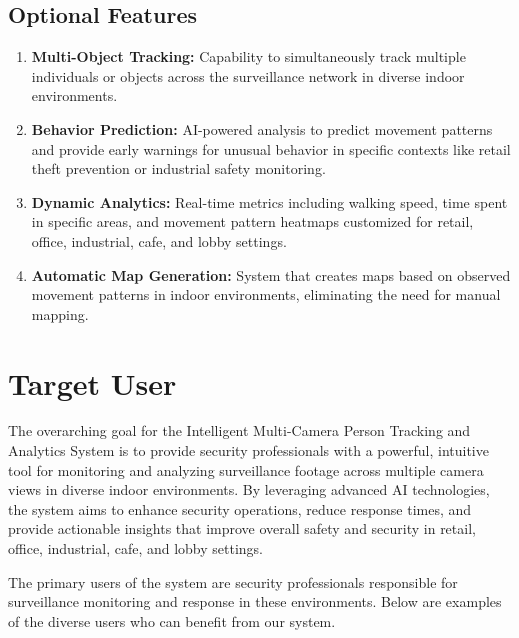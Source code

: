 \subsection{Optional Features}
\label{subsection:optional-features}

\begin{enumerate}[leftmargin=80pt]
    \item \textbf{Multi-Object Tracking:} Capability to simultaneously track multiple individuals or objects across the surveillance network in diverse indoor environments.
    \item \textbf{Behavior Prediction:} AI-powered analysis to predict movement patterns and provide early warnings for unusual behavior in specific contexts like retail theft prevention or industrial safety monitoring.
    \item \textbf{Dynamic Analytics:} Real-time metrics including walking speed, time spent in specific areas, and movement pattern heatmaps customized for retail, office, industrial, cafe, and lobby settings.
    \item \textbf{Automatic Map Generation:} System that creates maps based on observed movement patterns in indoor environments, eliminating the need for manual mapping.
\end{enumerate}

\section{Target User}
\label{section:target-user}

The overarching goal for the Intelligent Multi-Camera Person Tracking and Analytics System is to provide security professionals
with a powerful, intuitive tool for monitoring and analyzing surveillance footage across multiple camera views in diverse indoor environments.
By leveraging advanced AI technologies, the system aims to enhance security operations, reduce response times,
and provide actionable insights that improve overall safety and security in retail, office, industrial, cafe, and lobby settings.

The primary users of the system are security professionals responsible for surveillance monitoring and response in these environments.
Below are examples of the diverse users who can benefit from our system.

